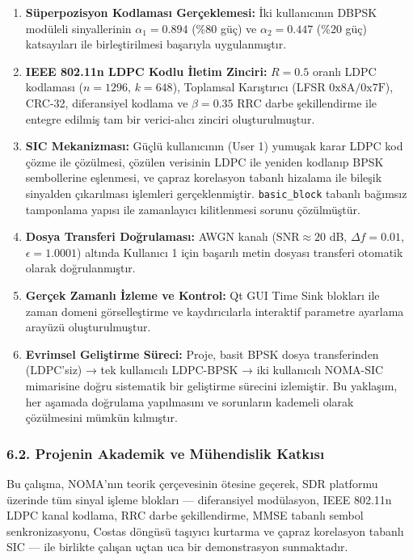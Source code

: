 \documentclass[
]{IEEEtran}
\begin{document}
\begin{enumerate}
\def\labelenumi{\arabic{enumi}.}
\item
  \textbf{Süperpozisyon Kodlaması Gerçeklemesi:} İki kullanıcının DBPSK
  modüleli sinyallerinin \(\alpha_1 = 0.894\) (\%80 güç) ve
  \(\alpha_2 = 0.447\) (\%20 güç) katsayıları ile birleştirilmesi
  başarıyla uygulanmıştır.
\item
  \textbf{IEEE 802.11n LDPC Kodlu İletim Zinciri:} \(R = 0.5\) oranlı
  LDPC kodlaması (\(n = 1296\), \(k = 648\)), Toplamsal Karıştırıcı
  (LFSR \(0\text{x8A}/0\text{x7F}\)), CRC-32, diferansiyel kodlama ve
  \(\beta = 0.35\) RRC darbe şekillendirme ile entegre edilmiş tam bir
  verici-alıcı zinciri oluşturulmuştur.
\item
  \textbf{SIC Mekanizması:} Güçlü kullanıcının (User 1) yumuşak karar
  LDPC kod çözme ile çözülmesi, çözülen verisinin LDPC ile yeniden
  kodlanıp BPSK sembollerine eşlenmesi, ve çapraz korelasyon tabanlı
  hizalama ile bileşik sinyalden çıkarılması işlemleri gerçeklenmiştir.
  \texttt{basic\_block} tabanlı bağımsız tamponlama yapısı ile
  zamanlayıcı kilitlenmesi sorunu çözülmüştür.
\item
  \textbf{Dosya Transferi Doğrulaması:} AWGN kanalı
  (\(\text{SNR} \approx 20\) dB, \(\Delta f = 0.01\),
  \(\epsilon = 1.0001\)) altında Kullanıcı 1 için başarılı metin dosyası
  transferi otomatik olarak doğrulanmıştır.
\item
  \textbf{Gerçek Zamanlı İzleme ve Kontrol:} Qt GUI Time Sink blokları
  ile zaman domeni görselleştirme ve kaydırıcılarla interaktif parametre
  ayarlama arayüzü oluşturulmuştur.
\item
  \textbf{Evrimsel Geliştirme Süreci:} Proje, basit BPSK dosya
  transferinden (LDPC'siz) → tek kullanıcılı LDPC-BPSK → iki kullanıcılı
  NOMA-SIC mimarisine doğru sistematik bir geliştirme sürecini
  izlemiştir. Bu yaklaşım, her aşamada doğrulama yapılmasını ve
  sorunların kademeli olarak çözülmesini mümkün kılmıştır.
\end{enumerate}

\subsubsection{6.2. Projenin Akademik ve Mühendislik
Katkısı}\label{projenin-akademik-ve-muxfchendislik-katkux131sux131}

Bu çalışma, NOMA'nın teorik çerçevesinin ötesine geçerek, SDR platformu
üzerinde tüm sinyal işleme blokları --- diferansiyel modülasyon, IEEE
802.11n LDPC kanal kodlama, RRC darbe şekillendirme, MMSE tabanlı sembol
senkronizasyonu, Costas döngüsü taşıyıcı kurtarma ve çapraz korelasyon
tabanlı SIC --- ile birlikte çalışan uçtan uca bir demonstrasyon
sunmaktadır.
\end{document}
